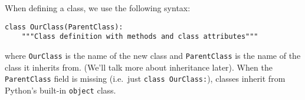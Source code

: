 When defining a class, we use the following syntax:
\begin{lstlisting}
class OurClass(ParentClass):
    """Class definition with methods and class attributes"""
\end{lstlisting}
where \texttt{OurClass} is the name of the new class and \texttt{ParentClass} is
the name of the class it inherits from. (We'll talk more about inheritance
later). When the \texttt{ParentClass} field is missing (i.e.\ just \texttt{class
OurClass:}), classes inherit from Python's built-in \texttt{object} class.

